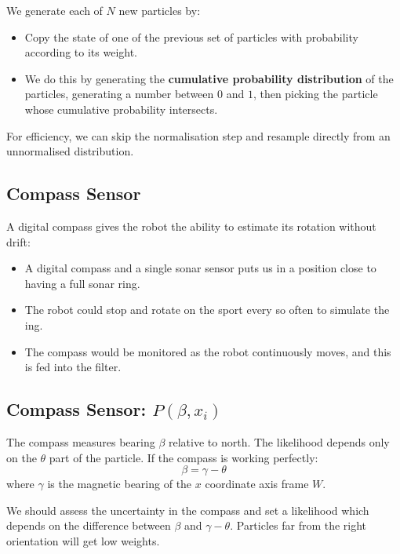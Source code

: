 \documentclass[11pt]{article}
\begin{document}
We generate each of $N$ new particles by:
\begin{itemize}
  \item Copy the state of one of the previous set of particles with probability according to its weight.
  \item We do this by generating the \textbf{cumulative probability distribution} of the particles, generating a number between $0$ and $1$, then picking the particle whose cumulative probability intersects.
\end{itemize}

For efficiency, we can skip the normalisation step and resample directly from an unnormalised distribution.

\subsection{Compass Sensor}
A digital compass gives the robot the ability to estimate its rotation without drift:
\begin{itemize}
  \item A digital compass and a single sonar sensor puts us in a position close to having a full sonar ring.
  \item The robot could stop and rotate on the sport every so often to simulate the ing.
  \item The compass would be monitored as the robot continuously moves, and this is fed into the filter.
\end{itemize}

\subsection{Compass Sensor: $P(\beta, x_i)$}
The compass measures bearing $\beta$ relative to north.
The likelihood depends only on the $\theta$ part of the particle.
If the compass is working perfectly:
\[
  \beta = \gamma - \theta
\]
where $\gamma$ is the magnetic bearing of the $x$ coordinate axis frame $W$.

We should assess the uncertainty in the compass and set a likelihood which depends on the difference between $\beta$ and $\gamma - \theta$.
Particles far from the right orientation will get low weights.
\end{document}

